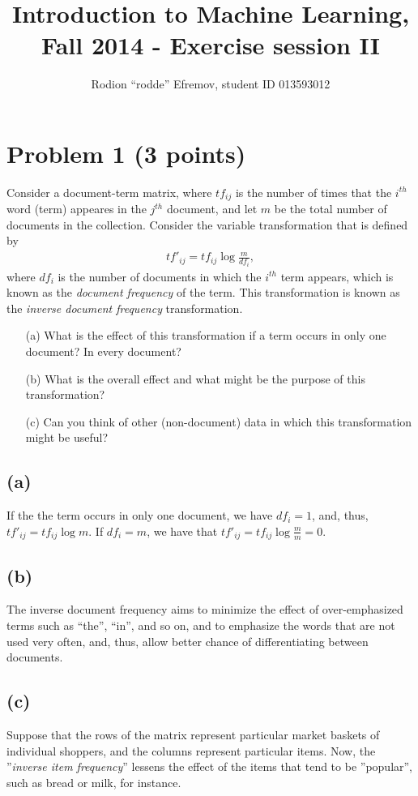 \documentclass[10pt]{article}
\title{Introduction to Machine Learning, Fall 2014 - Exercise session II}
\author{Rodion ``rodde'' Efremov, student ID 013593012}
\begin{document}
 \maketitle

\color{blue}
\section*{Problem 1 (3 points)}
Consider a document-term matrix, where $tf_{ij}$ is the number of times that the $i^{th}$ word (term) appeares in the $j^{th}$ document, and let $m$ be the total number of documents in the collection. Consider the variable transformation that is defined by
\begin{align}
tf'_{ij} = tf_{ij} \log \frac{m}{df_i},
\end{align}
where $df_i$ is the number of documents in which the $i^{th}$ term appears, which is known as the \textit{document frequency} of the term. This transformation is known as the \textit{inverse document frequency} transformation.
\begin{itemize}
\item[(a)] What is the effect of this transformation if a term occurs in only one document? In every document?
\item[(b)] What is the overall effect and what might be the purpose of this transformation?
\item[(c)] Can you think of other (non-document) data in which this transformation might be useful?
\end{itemize}

\color{black}
\subsection*{(a)}
If the the term occurs in only one document, we have $df_i = 1$, and, thus, $tf'_{ij} = tf_{ij}\log m$. If $df_i = m$, we have that $tf'_{ij} = tf_{ij}\log \frac{m}{m} = 0$.

\subsection*{(b)}
The inverse document frequency aims to minimize the effect of over-emphasized terms such as ``the'', ``in'', and so on, and to emphasize the words that are not used very often, and, thus, allow better chance of differentiating between documents.

\subsection*{(c)}
Suppose that the rows of the matrix represent particular market baskets of individual shoppers, and the columns represent particular items. Now, the ''\textit{inverse item frequency}'' lessens the effect of the items that tend to be ''popular'', such as bread or milk, for instance.
\end{document}
